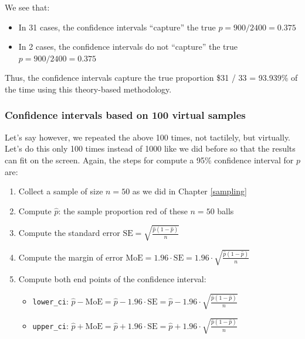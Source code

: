 \documentclass[12pt,]{krantz}
\providecommand{\tightlist}{%
  \setlength{\itemsep}{0pt}\setlength{\parskip}{0pt}}
\theoremstyle{definition}
\theoremstyle{definition}
\theoremstyle{definition}
\theoremstyle{remark}
\begin{document}
We see that:

\begin{itemize}
\tightlist
\item
  In 31 cases, the confidence intervals ``capture'' the true
  \(p = 900 / 2400 = 0.375\)
\item
  In 2 cases, the confidence intervals do not ``capture'' the true
  \(p = 900 / 2400 = 0.375\)
\end{itemize}

Thus, the confidence intervals capture the true proportion \$31 / 33 =
93.939\% of the time using this theory-based methodology.

\subsubsection*{Confidence intervals based on 100 virtual
samples}\label{confidence-intervals-based-on-100-virtual-samples}

Let's say however, we repeated the above 100 times, not tactilely, but
virtually. Let's do this only 100 times instead of 1000 like we did
before so that the results can fit on the screen. Again, the steps for
compute a 95\% confidence interval for \(p\) are:

\begin{enumerate}
\def\labelenumi{\arabic{enumi}.}
\tightlist
\item
  Collect a sample of size \(n = 50\) as we did in Chapter
  \ref{sampling}
\item
  Compute \(\widehat{p}\): the sample proportion red of these \(n=50\)
  balls
\item
  Compute the standard error
  \(\text{SE} = \sqrt{\frac{\widehat{p}(1-\widehat{p})}{n}}\)
\item
  Compute the margin of error
  \(\text{MoE} = 1.96 \cdot \text{SE} = 1.96 \cdot \sqrt{\frac{\widehat{p}(1-\widehat{p})}{n}}\)
\item
  Compute both end points of the confidence interval:

  \begin{itemize}
  \tightlist
  \item
    \texttt{lower\_ci}:
    \(\widehat{p} - \text{MoE} = \widehat{p} - 1.96 \cdot \text{SE} = \widehat{p} - 1.96 \cdot \sqrt{\frac{\widehat{p}(1-\widehat{p})}{n}}\)
  \item
    \texttt{upper\_ci}:
    \(\widehat{p} + \text{MoE} = \widehat{p} + 1.96 \cdot \text{SE} = \widehat{p} +1.96 \cdot \sqrt{\frac{\widehat{p}(1-\widehat{p})}{n}}\)
  \end{itemize}
\end{enumerate}
\end{document}
